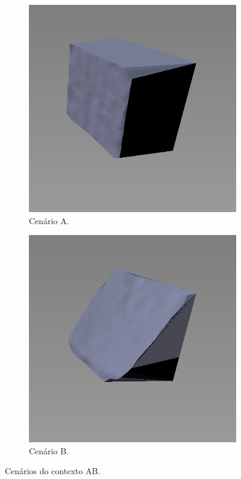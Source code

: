 \begin{figure}[H]
    \centering
    \begin{subfigure}[t]{0.33\textwidth}
        \includegraphics[width=\textwidth]{dados/figuras/AC1.png}
        \caption{Cenário A.}
    \end{subfigure}
    \hspace{1em}
    \begin{subfigure}[t]{0.33\textwidth}
        \includegraphics[width=\textwidth]{dados/figuras/AC2.png}
        \caption{Cenário B.}
    \end{subfigure}
    \caption{Cenários do contexto AB.}
    \label{fig:contexto_ab}
\end{figure}

